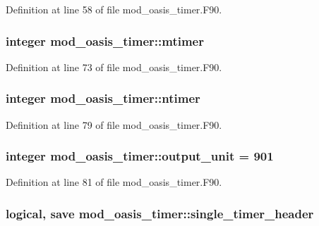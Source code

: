 Definition at line 58 of file mod\+\_\+oasis\+\_\+timer.\+F90.

\hypertarget{classmod__oasis__timer_acb04b78110e512ad551f7a500af70ef7}{
\subsubsection[{mtimer}]{\setlength{\rightskip}{0pt plus 5cm}integer mod\+\_\+oasis\+\_\+timer\+::mtimer\hspace{0.3cm}{\ttfamily [private]}}}\label{classmod__oasis__timer_acb04b78110e512ad551f7a500af70ef7}


Definition at line 73 of file mod\+\_\+oasis\+\_\+timer.\+F90.

\hypertarget{classmod__oasis__timer_aa92116f5ed11fd498b11b37e368e7b72}{
\subsubsection[{ntimer}]{\setlength{\rightskip}{0pt plus 5cm}integer mod\+\_\+oasis\+\_\+timer\+::ntimer\hspace{0.3cm}{\ttfamily [private]}}}\label{classmod__oasis__timer_aa92116f5ed11fd498b11b37e368e7b72}


Definition at line 79 of file mod\+\_\+oasis\+\_\+timer.\+F90.

\hypertarget{classmod__oasis__timer_a80e0bc610eb9e9b0aa07e926d5a9fde8}{
\subsubsection[{output\+\_\+unit}]{\setlength{\rightskip}{0pt plus 5cm}integer mod\+\_\+oasis\+\_\+timer\+::output\+\_\+unit = 901\hspace{0.3cm}{\ttfamily [private]}}}\label{classmod__oasis__timer_a80e0bc610eb9e9b0aa07e926d5a9fde8}


Definition at line 81 of file mod\+\_\+oasis\+\_\+timer.\+F90.

\hypertarget{classmod__oasis__timer_a3733877ab9fa9d07df0ff70f21cd08b0}{
\subsubsection[{single\+\_\+timer\+\_\+header}]{\setlength{\rightskip}{0pt plus 5cm}logical, save mod\+\_\+oasis\+\_\+timer\+::single\+\_\+timer\+\_\+header\hspace{0.3cm}{\ttfamily [private]}}}\label{classmod__oasis__timer_a3733877ab9fa9d07df0ff70f21cd08b0}


